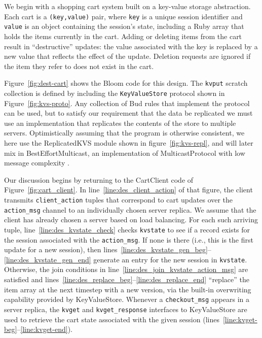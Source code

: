 We begin with a shopping cart system built on a key-value storage abstraction.
Each cart is a \texttt{(key,value)} pair, where \texttt{key} is a unique session
identifier and \texttt{value} is an object containing the session's state,
including a Ruby array that holds the items currently in the cart. Adding or deleting
items from the cart result in ``destructive'' updates: the value associated with
the key is replaced by a new value that reflects the effect of the
update. Deletion requests are ignored if the item they refer to does not exist
in the cart.

Figure~\ref{fig:dest-cart} shows the Bloom code for this design.  The
\texttt{kvput} scratch collection is defined by including the \texttt{KeyValueStore}
protocol shown in Figure~\ref{fig:kvs-proto}.  Any collection of Bud rules that
implement the protocol can be used, but to satisfy our requirement that the data
be replicated we must use an implementation that replicates the contents of the
store to multiple servers.  Optimistically assuming that the program is
otherwise consistent, we here use the ReplicatedKVS module shown in
figure~\ref{fig:kvs-repl}, and will later mix in BestEffortMulticast, an
implementation of MulticastProtocol with low message complexity .

Our discussion begins by returning to the CartClient code of Figure~\ref{fig:cart_client}.
In line~\ref{line:des_client_action} of that figure, the client
transmits \texttt{client\_action} tuples that correspond to cart updates over
the \texttt{action\_msg} channel to an individually chosen server replica.  We
assume that the client has already chosen a server based on load balancing.  For
each such arriving tuple, line~\ref{line:des_kvstate_check} checks
\texttt{kvstate} to see if a record exists for the session associated with the
\texttt{action\_msg}.  If none is there (i.e., this is the first update for a
new session), then
lines~\ref{line:des_kvstate_gen_beg}--\ref{line:des_kvstate_gen_end} generate
an entry for the new session in \texttt{kvstate}.  Otherwise, the join
conditions in line~\ref{line:des_join_kvstate_action_msg} are satisfied and
lines~\ref{line:des_replace_beg}--\ref{line:des_replace_end} ``replace'' the
item array at the next timestep with a new version, via the built-in overwriting
capability provided by KeyValueStore.  Whenever a \texttt{checkout\_msg} appears
in a server replica, the \texttt{kvget} and \texttt{kvget\_response} interfaces
to KeyValueStore are used to retrieve the cart state associated with the given
session (lines~\ref{line:kvget-beg}--\ref{line:kvget-end}).


